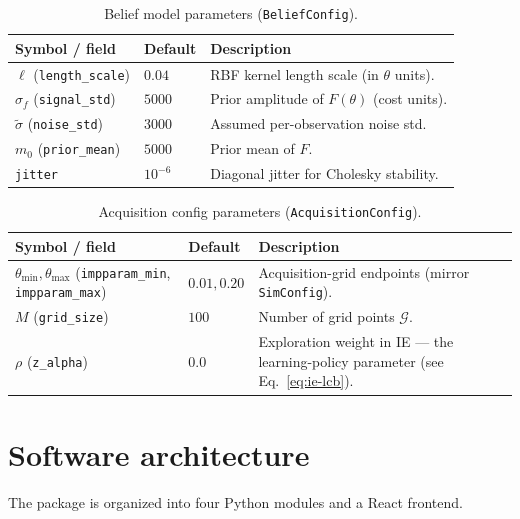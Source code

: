 \documentclass[11pt]{article}
\newcommand{\Cstar}{\theta}
\newcommand{\muprior}{m_0}
\newcommand{\sigTilde}{\tilde{\sigma}}
\newcommand{\code}[1]{\texttt{#1}}
\begin{document}
\begin{table}[h]
\centering\small
\begin{tabular}{@{}p{4.2cm}p{2cm}p{8.5cm}@{}}
  \toprule
  Symbol / field & Default & Description \\
  \midrule
  $\ell$ (\code{length\_scale})     & $0.04$  & RBF kernel length scale (in $\Cstar$ units). \\
  $\sigma_f$ (\code{signal\_std})   & $5000$  & Prior amplitude of $F(\Cstar)$ (cost units). \\
  $\sigTilde$ (\code{noise\_std})   & $3000$  & Assumed per-observation noise std. \\
  $\muprior$ (\code{prior\_mean})   & $5000$  & Prior mean of $F$. \\
  \code{jitter}                     & $10^{-6}$ & Diagonal jitter for Cholesky stability. \\
  \bottomrule
\end{tabular}
\caption{Belief model parameters (\code{BeliefConfig}).}
\label{tab:belief-params}
\end{table}

\begin{table}[h]
\centering\small
\begin{tabular}{@{}p{4.2cm}p{2cm}p{8.5cm}@{}}
  \toprule
  Symbol / field & Default & Description \\
  \midrule
  $\theta_{\min}, \theta_{\max}$ (\code{impparam\_min}, \code{impparam\_max}) & $0.01, 0.20$ & Acquisition-grid endpoints (mirror \code{SimConfig}). \\
  $M$ (\code{grid\_size})       & $100$        & Number of grid points $\mathcal{G}$. \\
  $\rho$ (\code{z\_alpha})      & $0.0$        & Exploration weight in IE — the learning-policy parameter (see Eq.~\eqref{eq:ie-lcb}). \\
  \bottomrule
\end{tabular}
\caption{Acquisition config parameters (\code{AcquisitionConfig}).}
\label{tab:acq-params}
\end{table}

\section{Software architecture}
\label{sec:arch}

The package is organized into four Python modules and a React frontend.
\end{document}
